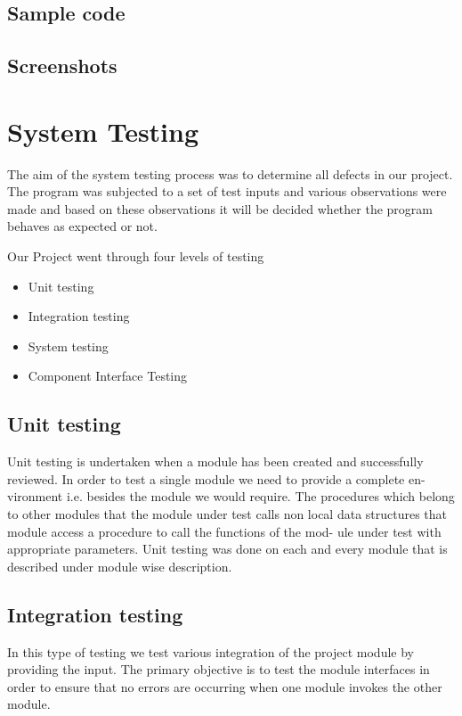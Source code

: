 \documentclass{article}
\begin{document}
\subsection{Sample code}
\vspace{1em}
\subsection{Screenshots}
\vspace{1em}


\newpage


\section{System Testing}
\vspace{1em}


The aim of the system testing process was to determine all defects in our project. The program was subjected to a set of test inputs and various observations were made and based on these observations it will be decided whether the program behaves as expected or not.

Our Project went through four levels of testing
\begin{itemize}
\item Unit testing
\item Integration testing
\item System testing
\item Component Interface Testing
\end{itemize}

\subsection{Unit testing}
Unit testing is undertaken when a module has been created and successfully reviewed. In order to test a single module we need to provide a complete en- vironment i.e. besides the module we would require. The procedures which belong to other modules that the module under test calls non local data structures that module access a procedure to call the functions of the mod- ule under test with appropriate parameters. Unit testing was done on each and every module that is described under module wise description.

\subsection{Integration testing}
In this type of testing we test various integration of the project module by providing the input. The primary objective is to test the module interfaces in order to ensure that no errors are occurring when one module invokes the other module.
\end{document}
